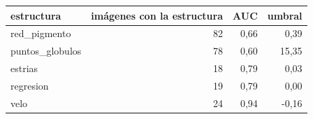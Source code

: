 \begin{tabular}{lrrr}
\toprule
estructura & imágenes con la estructura & AUC & umbral \\
\midrule
red_pigmento & 82 & 0{,}66 & 0{,}39 \\
puntos_globulos & 78 & 0{,}60 & 15{,}35 \\
estrias & 18 & 0{,}79 & 0{,}03 \\
regresion & 19 & 0{,}79 & 0{,}00 \\
velo & 24 & 0{,}94 & -0{,}16 \\
\bottomrule
\end{tabular}
